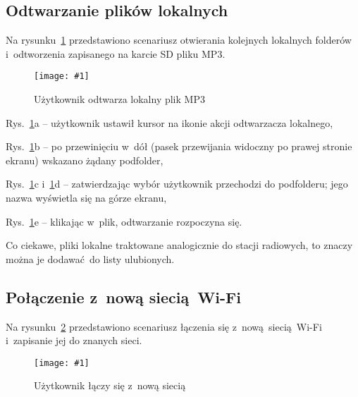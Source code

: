 \documentclass[polish]{aghengthesis}
\let\tempone\itemize
\let\temptwo\enditemize
\renewenvironment{itemize}{\tempone\setlength{\itemsep}{0cm}}{\temptwo}
\newcommand{\imgint}[4]{
	\begin{figure}[{#4}]
		\centering
		\texttt{[image: \#1]}
		\caption{#2}
		\label{#1}
	\end{figure}
}
\newcommand{\imgh}[3]{\imgint{#1}{#2}{#3}{H}}
\begin{document}
		\subsection{Odtwarzanie plików lokalnych}
			\newcommand{\rflocal}[1]{\ref{5/PicoRadio-fl-local}#1}
			
			Na rysunku~\rflocal{} przedstawiono scenariusz otwierania kolejnych lokalnych folderów i~odtworzenia zapisanego na karcie SD pliku MP3.
			
			\imgh{5/PicoRadio-fl-local}{Użytkownik odtwarza lokalny plik MP3}{0.9}	
			
			\begin{itemize}
				\item Rys.~\rflocal{a} -- użytkownik ustawił kursor na ikonie akcji odtwarzacza lokalnego,
				\item Rys.~\rflocal{b} -- po przewinięciu w~dół (pasek przewijania widoczny po prawej stronie ekranu) wskazano żądany podfolder,
				\item Rys.~\rflocal{c} i~\rflocal{d} -- zatwierdzając wybór użytkownik przechodzi do podfolderu; jego nazwa wyświetla się na górze ekranu,
				\item Rys.~\rflocal{e} -- klikając w~plik, odtwarzanie rozpoczyna się.
			\end{itemize}
			
			Co ciekawe, pliki lokalne traktowane analogicznie do stacji radiowych, to znaczy można je dodawać do listy ulubionych.
			
		\subsection{Połączenie z~nową siecią Wi-Fi}
			\newcommand{\rflwifi}[1]{\ref{5/PicoRadio-fl-wifi}#1}
			
			Na rysunku~\rflwifi{} przedstawiono scenariusz łączenia się z~nową siecią Wi-Fi i~zapisanie jej do znanych sieci.
			
			\imgh{5/PicoRadio-fl-wifi}{Użytkownik łączy się z~nową siecią}{0.9}
			
\end{document}
